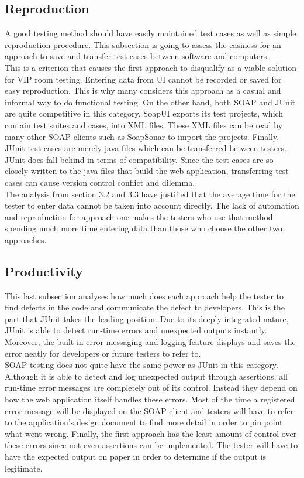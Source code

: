 \documentclass[12pt]{article}
\begin{document}
\subsection{Reproduction}
A good testing method should have easily maintained test cases as well as simple reproduction procedure. This subsection is going to assess the easiness for an approach to save and transfer test cases between software and computers.\\

This is a criterion that causes the first approach to disqualify as a viable solution for VIP room testing. Entering data from UI cannot be recorded or saved for easy reproduction. This is why many considers this approach as a casual and informal way to do functional testing. On the other hand, both SOAP and JUnit are quite competitive in this category. SoapUI exports its test projects, which contain test suites and cases, into XML files. These XML files can be read by many other SOAP clients such as SoapSonar to import the projects. Finally, JUnit test cases are merely java files which can be transferred between testers. JUnit does fall behind in terms of compatibility. Since the test cases are so closely written to the java files that build the web application, transferring test cases can cause version control conflict and dilemma.\\

The analysis from section 3.2 and 3.3 have justified that the average time for the tester to enter data cannot be taken into account directly. The lack of automation and reproduction for approach one makes the testers who use that method spending much more time entering data than those who choose the other two approaches.


\subsection{Productivity}
This last subsection analyses how much does each approach help the tester to find defects in the code and communicate the defect to developers. This is the part that JUnit takes the leading position. Due to its deeply integrated nature, JUnit is able to detect run-time errors and unexpected outputs instantly. Moreover, the built-in error messaging and logging feature displays and saves the error neatly for developers or future testers to refer to.\\
SOAP testing does not quite have the same power as JUnit in this category. Although it is able to detect and log unexpected output through assertions, all run-time error messages are completely out of its control. Instead they depend on how the web application itself handles these errors. Most of the time a registered error message will be displayed on the SOAP client and testers will have to refer to the application's design document to find more detail in order to pin point what went wrong. Finally, the first approach has the least amount of control over these errors since not even assertions can be implemented. The tester will have to have the expected output on paper in order to determine if the output is legitimate.\\
\newpage
\end{document}
